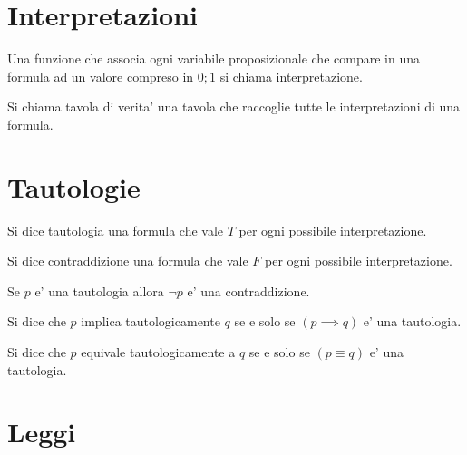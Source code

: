 \documentclass{report}
\begin{document}
    \section{Interpretazioni}
    \begin{defin}
        [Interpretazione]
        Una funzione che associa ogni variabile proposizionale che compare in una formula
        ad un valore compreso in ${0; 1}$ si chiama interpretazione.
    \end{defin}

    \begin{defin}
        Si chiama tavola di verita' una tavola che raccoglie tutte le interpretazioni
        di una formula.
    \end{defin}

    \section{Tautologie}
    \begin{defin}
        [Tautologia]
        Si dice tautologia una formula che vale $T$ per ogni possibile interpretazione.
    \end{defin}

    \begin{defin}
        [Contraddizione]
        Si dice contraddizione una formula che vale $F$ per ogni possibile interpretazione.
    \end{defin}

    \begin{obs}
        Se $p$ e' una tautologia allora $\neg p$ e' una contraddizione.
    \end{obs}

    \begin{defin}
        Si dice che $p$ implica tautologicamente $q$ se e solo se $(p \implies q)$ e' una tautologia.
    \end{defin}

    \begin{defin}
        Si dice che $p$ equivale tautologicamente a $q$ se e solo se $(p \equiv q)$ e' una tautologia.
    \end{defin}

    \section{Leggi}
\end{document}
